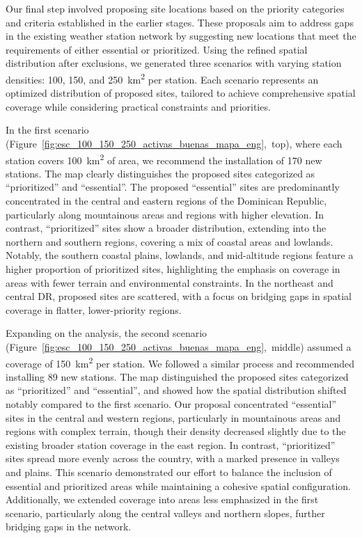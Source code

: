 \documentclass[spanish]{article}
\begin{document}
Our final step involved proposing site locations based on the priority
categories and criteria established in the earlier stages. These
proposals aim to address gaps in the existing weather station network by
suggesting new locations that meet the requirements of either essential
or prioritized. Using the refined spatial distribution after exclusions,
we generated three scenarios with varying station densities: 100, 150,
and 250~km\textsuperscript{2} per station. Each scenario represents an
optimized distribution of proposed sites, tailored to achieve
comprehensive spatial coverage while considering practical constraints
and priorities.

In the first scenario
(Figure~\ref{fig:esc_100_150_250_activas_buenas_mapa_eng},~top), where
each station covers 100~km\textsuperscript{2} of area, we recommend the
installation of 170 new stations. The map clearly distinguishes the
proposed sites categorized as ``prioritized'' and ``essential''. The
proposed ``essential'' sites are predominantly concentrated in the
central and eastern regions of the Dominican Republic, particularly
along mountainous areas and regions with higher elevation. In contrast,
``prioritized'' sites show a broader distribution, extending into the
northern and southern regions, covering a mix of coastal areas and
lowlands. Notably, the southern coastal plains, lowlands, and
mid-altitude regions feature a higher proportion of prioritized sites,
highlighting the emphasis on coverage in areas with fewer terrain and
environmental constraints. In the northeast and central DR, proposed
sites are scattered, with a focus on bridging gaps in spatial coverage
in flatter, lower-priority regions.

Expanding on the analysis, the second scenario
(Figure~\ref{fig:esc_100_150_250_activas_buenas_mapa_eng},~middle)
assumed a coverage of 150~km\textsuperscript{2} per station. We followed
a similar process and recommended installing 89 new stations. The map
distinguished the proposed sites categorized as ``prioritized'' and
``essential'', and showed how the spatial distribution shifted notably
compared to the first scenario. Our proposal concentrated ``essential''
sites in the central and western regions, particularly in mountainous
areas and regions with complex terrain, though their density decreased
slightly due to the existing broader station coverage in the east
region. In contrast, ``prioritized'' sites spread more evenly across the
country, with a marked presence in valleys and plains. This scenario
demonstrated our effort to balance the inclusion of essential and
prioritized areas while maintaining a cohesive spatial configuration.
Additionally, we extended coverage into areas less emphasized in the
first scenario, particularly along the central valleys and northern
slopes, further bridging gaps in the network.
\end{document}
